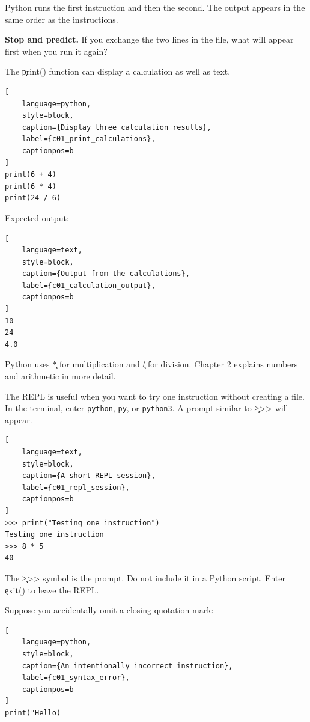 Python runs the first instruction and then the second. The output appears in
the same order as the instructions.

\begin{NoteBox}
\textbf{Stop and predict.} If you exchange the two lines in the file, what will
appear first when you run it again?
\end{NoteBox}


The \c{print()} function can display a calculation as well as text.

\begin{lstlisting}[
    language=python,
    style=block,
    caption={Display three calculation results},
    label={c01_print_calculations},
    captionpos=b
]
print(6 + 4)
print(6 * 4)
print(24 / 6)
\end{lstlisting}

Expected output:

\begin{lstlisting}[
    language=text,
    style=block,
    caption={Output from the calculations},
    label={c01_calculation_output},
    captionpos=b
]
10
24
4.0
\end{lstlisting}

Python uses \c{*} for multiplication and \c{/} for division. Chapter 2
explains numbers and arithmetic in more detail.


The REPL is useful when you want to try one instruction without creating a
file. In the terminal, enter \texttt{python}, \texttt{py}, or
\texttt{python3}. A prompt similar to \c{>>>} will appear.

\begin{lstlisting}[
    language=text,
    style=block,
    caption={A short REPL session},
    label={c01_repl_session},
    captionpos=b
]
>>> print("Testing one instruction")
Testing one instruction
>>> 8 * 5
40
\end{lstlisting}

The \c{>>>} symbol is the prompt. Do not include it in a Python script. Enter
\c{exit()} to leave the REPL.


Suppose you accidentally omit a closing quotation mark:

\begin{lstlisting}[
    language=python,
    style=block,
    caption={An intentionally incorrect instruction},
    label={c01_syntax_error},
    captionpos=b
]
print("Hello)
\end{lstlisting}

